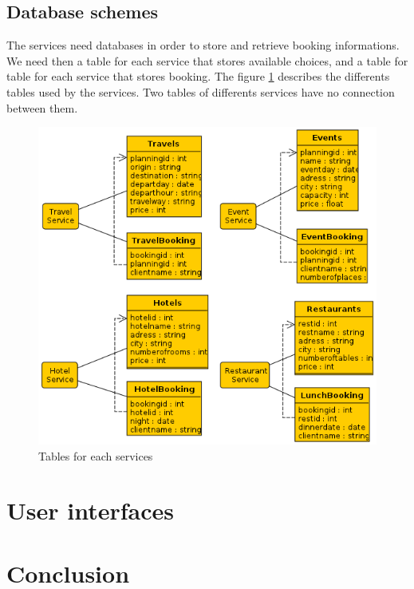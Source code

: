 \documentclass[a4paper]{article}
\begin{document}
		\subsection{Database schemes}
		
		The services need databases in order to store and retrieve booking informations. We need then a table for each service that stores available choices, and a table for table for each service that stores booking. The figure \ref{fig:globaldb} describes the differents tables used by the services. Two tables of differents services have no connection between them.
		
		\begin{figure}[htp]
			\centering
			\includegraphics[width=\textwidth]{database.png}
			\caption{Tables for each services}
			\label{fig:globaldb}
		\end{figure}
	
	
	
	
	
	\section{User interfaces}
	
	\section*{Conclusion}
\end{document}
